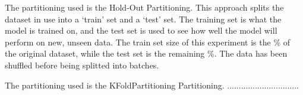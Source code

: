 \documentclass[12pt, a4paper]{article}
\begin{document}
The partitioning used is the Hold-Out Partitioning.
This approach splits the dataset in use into a ‘train’ set and a ‘test’ set.
The training set is what the model is trained on, and the test set is used to see how
well the model will perform on new, unseen data.
\hfill\break
\hfill\break
The train set size of this experiment is the \%
of the original dataset, while the test set is the remaining \%.
\hfill\break
\hfill\break
{}
The data has been shuffled before being splitted into batches.





The partitioning used is the KFoldPartitioning Partitioning.
...............................
\hfill\break
\hfill\break
\hfill\break
\hfill\break
{}
\end{document}
